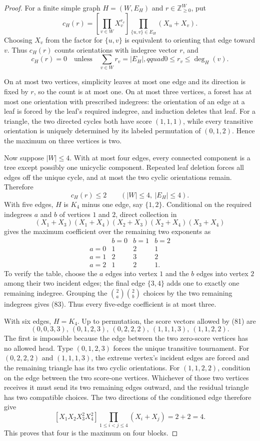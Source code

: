 \documentclass{article}
\begin{document}
\begin{proof}
For a finite simple graph \(H=(W,E_H)\) and \(r\in\mathbb Z_{\ge0}^W\), put
\[
 c_H(r)=\left[\prod_{v\in W}X_v^{r_v}\right]
 \prod_{\{u,v\}\in E_H}(X_u+X_v).
\tag{80}
\]
Choosing \(X_v\) from the factor for \(\{u,v\}\) is equivalent to orienting that edge toward \(v\).  Thus \(c_H(r)\) counts orientations with indegree vector \(r\), and
\[
 c_H(r)=0\quad\text{unless}\quad
 \sum_{v\in W}r_v=|E_H|,qquad
 0\le r_v\le\deg_H(v).
\tag{81}
\]

On at most two vertices, simplicity leaves at most one edge and its direction is fixed by \(r\), so the count is at most one.  On at most three vertices, a forest has at most one orientation with prescribed indegrees: the orientation of an edge at a leaf is forced by the leaf's required indegree, and induction deletes that leaf.  For a triangle, the two directed cycles both have score \((1,1,1)\), while every transitive orientation is uniquely determined by its labeled permutation of \((0,1,2)\).  Hence the maximum on three vertices is two.

Now suppose \(|W|\le4\).  With at most four edges, every connected component is a tree except possibly one unicyclic component.  Repeated leaf deletion forces all edges off the unique cycle, and at most the two cyclic orientations remain.  Therefore
\[
 c_H(r)\le2\qquad(|W|\le4,\ |E_H|\le4).
\tag{82}
\]
With five edges, \(H\) is \(K_4\) minus one edge, say \(\{1,2\}\).  Conditional on the required indegrees \(a\) and \(b\) of vertices \(1\) and \(2\), direct collection in
\[
 (X_1+X_3)(X_1+X_4)(X_2+X_3)(X_2+X_4)(X_3+X_4)
\]
gives the maximum coefficient over the remaining two exponents as
\[
 \begin{array}{c|ccc}
  &b=0&b=1&b=2\\ \hline
 a=0&1&2&1\\
 a=1&2&3&2\\
 a=2&1&2&1.
 \end{array}
\tag{83}
\]
To verify the table, choose the \(a\) edges into vertex \(1\) and the \(b\) edges into vertex \(2\) among their two incident edges; the final edge \(\{3,4\}\) adds one to exactly one remaining indegree.  Grouping the \(\binom2a\binom2b\) choices by the two remaining indegrees gives (83).  Thus every five-edge coefficient is at most three.

With six edges, \(H=K_4\).  Up to permutation, the score vectors allowed by (81) are
\[
 (0,0,3,3),\ (0,1,2,3),\ (0,2,2,2),\
 (1,1,1,3),\ (1,1,2,2).
\tag{84}
\]
The first is impossible because the edge between the two zero-score vertices has no allowed head.  Type \((0,1,2,3)\) forces the unique transitive tournament.  For \((0,2,2,2)\) and \((1,1,1,3)\), the extreme vertex's incident edges are forced and the remaining triangle has its two cyclic orientations.  For \((1,1,2,2)\), condition on the edge between the two score-one vertices.  Whichever of those two vertices receives it must send its two remaining edges outward, and the residual triangle has two compatible choices.  The two directions of the conditioned edge therefore give
\[
 [X_1X_2X_3^2X_4^2]
 \prod_{1\le i<j\le4}(X_i+X_j)=2+2=4.
\tag{85}
\]
This proves that four is the maximum on four blocks.


\end{proof}
\end{document}
